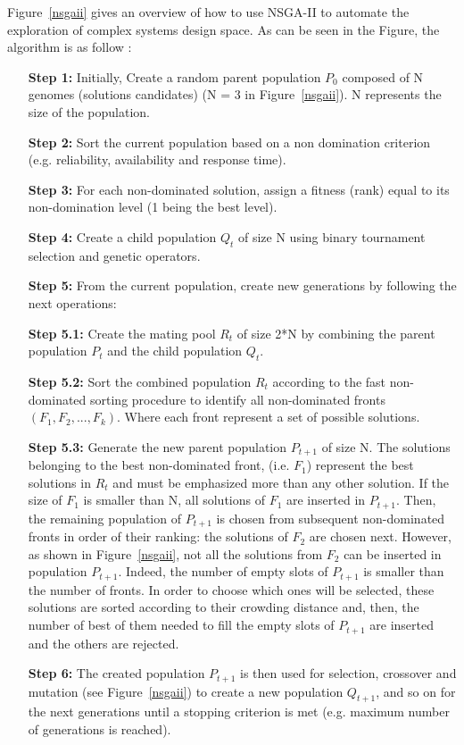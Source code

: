 \documentclass[conference]{IEEEtran}
\begin{document}
Figure~\ref{nsgaii} gives an overview of how to use NSGA-II to automate the exploration of complex systems design space. As can be seen in the Figure, the algorithm is as follow :

\begin{enumerate}
\item[\textbf{Step 1:}] Initially, Create a random parent population $P_{0}$ composed of N genomes (solutions candidates) (N = 3 in Figure~\ref{nsgaii}). N represents the size of the population.
\item[\textbf{Step 2:}] Sort the current population based on a non domination criterion (e.g. reliability, availability and response time).
\item[\textbf{Step 3:}] For each non-dominated solution, assign a fitness (rank) equal to its non-domination level (1 being the best level).
\item[\textbf{Step 4:}] Create a child population $Q_{t}$ of size N using binary tournament selection and genetic operators.
\item[\textbf{Step 5:}] From the current population, create new generations by following the next operations:
\item[\textbf{Step 5.1:}] Create the mating pool $R_{t}$ of size 2*N by combining the parent population $P_{t}$ and the child population $Q_{t}$.
\item[\textbf{Step 5.2:}] Sort the combined population $R_{t}$ according to the fast non-dominated sorting procedure\cite{Deb:2002:FEM:2221359.2221582} to identify all non-dominated fronts $(F_{1} ,F_{2},...,F_{k})$. Where each front represent a set of possible solutions.
\item[\textbf{Step 5.3:}] Generate the new parent population $P_{t+1}$ of size N. The solutions belonging to the best non-dominated front, (i.e. $F_{1}$) represent the best solutions in $R_{t}$ and must be emphasized more than any other solution. If the size of $F_{1}$ is smaller than N, all solutions of $F_{1}$ are inserted in $P_{t+1}$. Then, the remaining population of $P_{t+1}$ is chosen from subsequent non-dominated fronts in order of their ranking: the solutions of $F_{2}$ are chosen next. However, as shown in Figure~\ref{nsgaii}, not all the solutions from $F_{2}$ can be inserted in population $P_{t+1}$. Indeed, the number of empty slots of $P_{t+1}$ is smaller than the number of fronts. In order to choose which ones will be selected, these solutions are sorted according to their crowding distance and, then, the number of best of them needed to fill the empty slots of $P_{t+1}$ are inserted and the others are rejected.
\item[\textbf{Step 6:}] The created population $P_{t+1}$ is then used for selection, crossover and mutation (see Figure~\ref{nsgaii}) to create a new population $Q_{t+1}$, and so on for the next generations until a stopping criterion is met (e.g. maximum number of generations is reached).


\end{enumerate}
\end{document}
